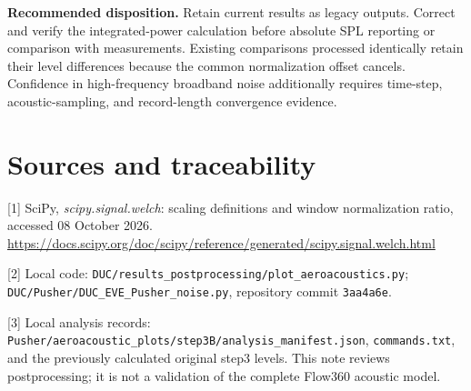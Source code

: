 \documentclass[english]{achleitner-report}
\begin{document}
\textbf{Recommended disposition.} Retain current results as legacy outputs. Correct and verify the integrated-power calculation before absolute SPL reporting or comparison with measurements. Existing comparisons processed identically retain their level differences because the common normalization offset cancels. Confidence in high-frequency broadband noise additionally requires time-step, acoustic-sampling, and record-length convergence evidence.

\section*{Sources and traceability}
\small
[1] SciPy, \emph{scipy.signal.welch}: scaling definitions and window normalization ratio, accessed 08 October 2026.\\
\url{https://docs.scipy.org/doc/scipy/reference/generated/scipy.signal.welch.html}

[2] Local code: \texttt{DUC/results\_postprocessing/plot\_aeroacoustics.py}; \texttt{DUC/Pusher/DUC\_EVE\_Pusher\_noise.py}, repository commit \texttt{3aa4a6e}.

[3] Local analysis records: \texttt{Pusher/aeroacoustic\_plots/step3B/analysis\_manifest.json}, \texttt{commands.txt}, and the previously calculated original step3 levels. This note reviews postprocessing; it is not a validation of the complete Flow360 acoustic model.
\end{document}
